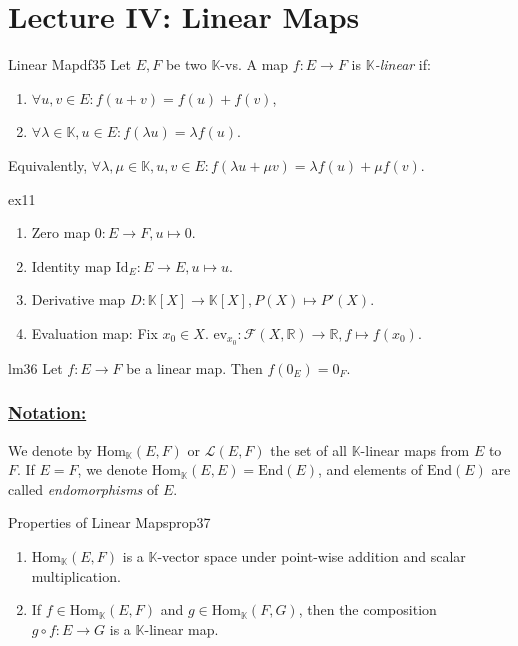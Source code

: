 \documentclass[11pt, a4paper]{article}
\newcommand{\R}{\mathbb{R}}
\newcommand{\K}{\mathbb{K}}
\begin{document}
\section{Lecture IV: Linear Maps}

\begin{definition}{Linear Map}{df35}
  Let $E, F$ be two $\K$-vs. A map $f: E \to F$ is \emph{$\K$-linear} if:
  \begin{enumerate}
    \item $\forall u, v \in E: f(u + v) = f(u) + f(v)$,
    \item $\forall \lambda \in \K, u \in E: f(\lambda u) = \lambda f(u)$.
  \end{enumerate}
  Equivalently, $\forall \lambda, \mu \in \K, u, v \in E: f(\lambda u + \mu v) = \lambda f(u) + \mu f(v)$.
\end{definition}

\begin{example}{}{ex11}
  \begin{enumerate}
    \item Zero map $0: E \to F, u \mapsto 0$.
    \item Identity map $\text{Id}_E: E \to E, u \mapsto u$.
    \item Derivative map $D: \K[X] \to \K[X], P(X) \mapsto P'(X)$.
    \item Evaluation map: Fix $x_0 \in X$. $\text{ev}_{x_0}: \mathcal{F}(X, \R) \to \R, f \mapsto f(x_0)$.
  \end{enumerate}
\end{example}

\begin{lemma}{}{lm36}
  Let $f: E \to F$ be a linear map. Then $f(0_E) = 0_F$.
\end{lemma}

\subsubsection*{\underline{Notation:}}
We denote by $\text{Hom}_\K(E, F)$ or $\mathcal{L}(E, F)$ the set of all $\K$-linear maps from $E$ to $F$.
If $E = F$, we denote $\text{Hom}_\K(E, E) = \text{End}(E)$, and elements of $\text{End}(E)$ are called \emph{endomorphisms} of $E$.

\begin{proposition}{Properties of Linear Maps}{prop37}
  \begin{enumerate}
    \item $\text{Hom}_\K(E, F)$ is a $\K$-vector space under point-wise addition and scalar multiplication.
    \item If $f \in \text{Hom}_\K(E, F)$ and $g \in \text{Hom}_\K(F, G)$, then the composition $g \circ f: E \to G$ is a $\K$-linear map.
  \end{enumerate}
\end{proposition}
\end{document}
